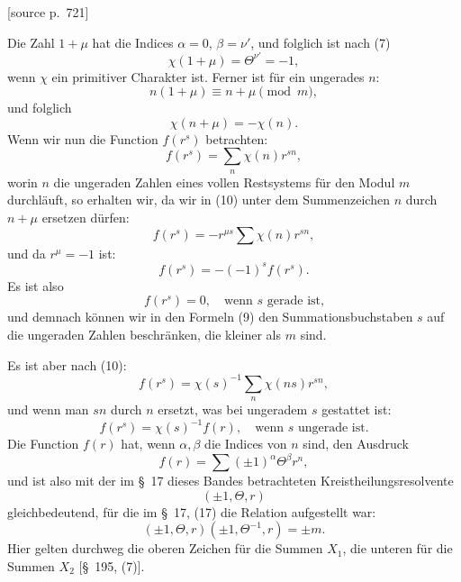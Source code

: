 \documentclass[11pt]{article}
\newcommand{\srcpage}[1]{\par\medskip\noindent\textsf{[source p.~#1]}\par\smallskip}
\begin{document}
\srcpage{721}
Die Zahl $1+\mu$ hat die Indices $\alpha=0$, $\beta=\nu'$, und folglich ist nach (7)
\[
\chi(1+\mu)=\Theta^{\nu'}=-1,
\]
wenn $\chi$ ein primitiver Charakter ist. Ferner ist für ein ungerades $n$:
\[
n(1+\mu)\equiv n+\mu\pmod m,
\]
und folglich
\[
\chi(n+\mu)=-\chi(n).
\]
Wenn wir nun die Function $f(r^s)$ betrachten:
\begin{equation}
f(r^s)=\sum_n\chi(n)r^{sn},
\tag{10}
\end{equation}
worin $n$ die ungeraden Zahlen eines vollen Restsystems für den Modul $m$ durchläuft, so erhalten wir, da wir in (10) unter dem Summenzeichen $n$ durch $n+\mu$ ersetzen dürfen:
\[
f(r^s)=-r^{\mu s}\sum\chi(n)r^{sn},
\]
und da $r^\mu=-1$ ist:
\[
f(r^s)=-(-1)^sf(r^s).
\]
Es ist also
\begin{equation}
f(r^s)=0,\quad \text{wenn }s\text{ gerade ist,}
\tag{11}
\end{equation}
und demnach können wir in den Formeln (9) den Summationsbuchstaben $s$ auf die ungeraden Zahlen beschränken, die kleiner als $m$ sind.

Es ist aber nach (10):
\[
f(r^s)=\chi(s)^{-1}\sum_n\chi(ns)r^{sn},
\]
und wenn man $sn$ durch $n$ ersetzt, was bei ungeradem $s$ gestattet ist:
\begin{equation}
f(r^s)=\chi(s)^{-1}f(r),\quad \text{wenn }s\text{ ungerade ist.}
\tag{12}
\end{equation}
Die Function $f(r)$ hat, wenn $\alpha,\beta$ die Indices von $n$ sind, den Ausdruck
\begin{equation}
f(r)=\sum(\pm1)^\alpha\Theta^\beta r^n,
\tag{13}
\end{equation}
und ist also mit der im \S~17 dieses Bandes betrachteten Kreistheilungsresolvente
\[
(\pm1,\Theta,r)
\]
gleichbedeutend, für die im \S~17, (17) die Relation aufgestellt war:
\begin{equation}
(\pm1,\Theta,r)(\pm1,\Theta^{-1},r)=\pm m.
\tag{14}
\end{equation}
Hier gelten durchweg die oberen Zeichen für die Summen $X_1$, die unteren für die Summen $X_2$ [\S~195, (7)].
\end{document}
